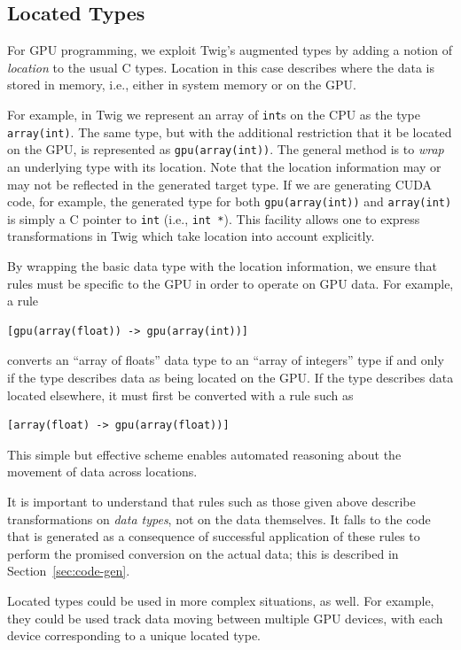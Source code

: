 \subsection{Located Types}
\label{sec:located-types}

For GPU programming, we exploit Twig's augmented types by adding a notion of \emph{location} to the usual C types. Location in this case describes where the data is stored in memory, i.e., either in system memory or on the GPU.

For example, in Twig we represent an array of \texttt{int}s on the CPU as the type \texttt{array(int)}. The same type, but with the additional restriction that it be located on the GPU, is represented as \texttt{gpu(array(int))}. The general method is to \emph{wrap} an underlying type with its location. Note that the location information may or may not be reflected in the generated target type. If we are generating CUDA code, for example, the generated type for both \texttt{gpu(array(int))} and \texttt{array(int)} is simply a C pointer to \texttt{int} (i.e., \texttt{int *}). This facility allows one to express transformations in Twig which take location into account explicitly.

By wrapping the basic data type with the location information, we ensure that rules must be specific to the GPU in order to operate on GPU data. For example, a rule

\begin{verbatim}
[gpu(array(float)) -> gpu(array(int))]
\end{verbatim}

converts an ``array of floats'' data type to an ``array of integers'' type if and only if the type describes data as being located on the GPU. If the type describes data located elsewhere, it must first be converted with a rule such as

\begin{verbatim}
[array(float) -> gpu(array(float))]
\end{verbatim}

This simple but effective scheme enables automated reasoning about the movement of data across locations.

It is important to understand that rules such as those given above describe transformations on \emph{data types}, not on the data themselves. It falls to the code that is generated as a consequence of successful application of these rules to perform the promised conversion on the actual data; this is described in Section~\ref{sec:code-gen}.

Located types could be used in more complex situations, as well. For example, they could be used track data moving between multiple GPU devices, with each device corresponding to a unique located type.
